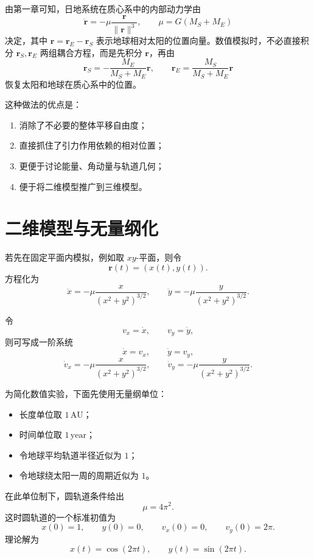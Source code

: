 \documentclass[12pt,a4paper]{ctexrep}
\begin{document}
由第一章可知，日地系统在质心系中的内部动力学由
\[
\ddot{\bm r}=-\mu \frac{\bm r}{\|\bm r\|^3},
\qquad
\mu=G(M_S+M_E)
\]
决定，其中 \(\bm r=\bm r_E-\bm r_S\) 表示地球相对太阳的位置向量。数值模拟时，不必直接积分 \(\bm r_S,\bm r_E\) 两组耦合方程，而是先积分 \(\bm r\)，再由
\[
\bm r_S=-\frac{M_E}{M_S+M_E}\bm r,
\qquad
\bm r_E=\frac{M_S}{M_S+M_E}\bm r
\]
恢复太阳和地球在质心系中的位置。

这种做法的优点是：
\begin{enumerate}[label=\arabic*.]
  \item 消除了不必要的整体平移自由度；
  \item 直接抓住了引力作用依赖的相对位置；
  \item 更便于讨论能量、角动量与轨道几何；
  \item 便于将二维模型推广到三维模型。
\end{enumerate}

\section{二维模型与无量纲化}

若先在固定平面内模拟，例如取 \(xy\)-平面，则令
\[
\bm r(t)=(x(t),y(t)).
\]
方程化为
\begin{equation}\label{eq:2d-second}
\ddot x=-\mu \frac{x}{(x^2+y^2)^{3/2}},
\qquad
\ddot y=-\mu \frac{y}{(x^2+y^2)^{3/2}}.
\end{equation}

令
\[
v_x=\dot x,\qquad v_y=\dot y,
\]
则可写成一阶系统
\begin{equation}\label{eq:2d-first}
\dot x=v_x,\qquad \dot y=v_y,
\end{equation}
\begin{equation}\label{eq:2d-first-2}
\dot v_x=-\mu \frac{x}{(x^2+y^2)^{3/2}},
\qquad
\dot v_y=-\mu \frac{y}{(x^2+y^2)^{3/2}}.
\end{equation}

为简化数值实验，下面先使用无量纲单位：
\begin{itemize}
  \item 长度单位取 \(1\,\mathrm{AU}\)；
  \item 时间单位取 \(1\,\mathrm{year}\)；
  \item 令地球平均轨道半径近似为 \(1\)；
  \item 令地球绕太阳一周的周期近似为 \(1\)。
\end{itemize}
在此单位制下，圆轨道条件给出
\[
\mu=4\pi^2.
\]
这时圆轨道的一个标准初值为
\begin{equation}\label{eq:circular-ic}
x(0)=1,\qquad y(0)=0,\qquad v_x(0)=0,\qquad v_y(0)=2\pi.
\end{equation}
理论解为
\[
x(t)=\cos(2\pi t),\qquad y(t)=\sin(2\pi t).
\]
\end{document}
